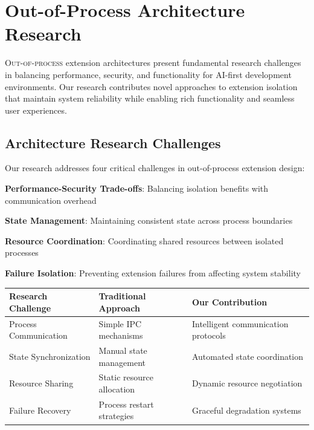 
\section*{Out-of-Process Architecture Research}

\lettrine{O}{ut-of-process} extension architectures present fundamental research challenges in balancing performance, security, and functionality for AI-first development environments. Our research contributes novel approaches to extension isolation that maintain system reliability while enabling rich functionality and seamless user experiences.

\subsection*{Architecture Research Challenges}

Our research addresses four critical challenges in out-of-process extension design:

\begin{expandedlist}
    \item \textbf{Performance-Security Trade-offs}: Balancing isolation benefits with communication overhead
    \item \textbf{State Management}: Maintaining consistent state across process boundaries
    \item \textbf{Resource Coordination}: Coordinating shared resources between isolated processes
    \item \textbf{Failure Isolation}: Preventing extension failures from affecting system stability
\end{expandedlist}

\begin{center}
\begin{tabular}{@{}lll@{}}
\toprule
\textbf{Research Challenge} & \textbf{Traditional Approach} & \textbf{Our Contribution} \\
\midrule
Process Communication & Simple IPC mechanisms & Intelligent communication protocols \\
State Synchronization & Manual state management & Automated state coordination \\
Resource Sharing & Static resource allocation & Dynamic resource negotiation \\
Failure Recovery & Process restart strategies & Graceful degradation systems \\
\bottomrule
\end{tabular}
\end{center}

